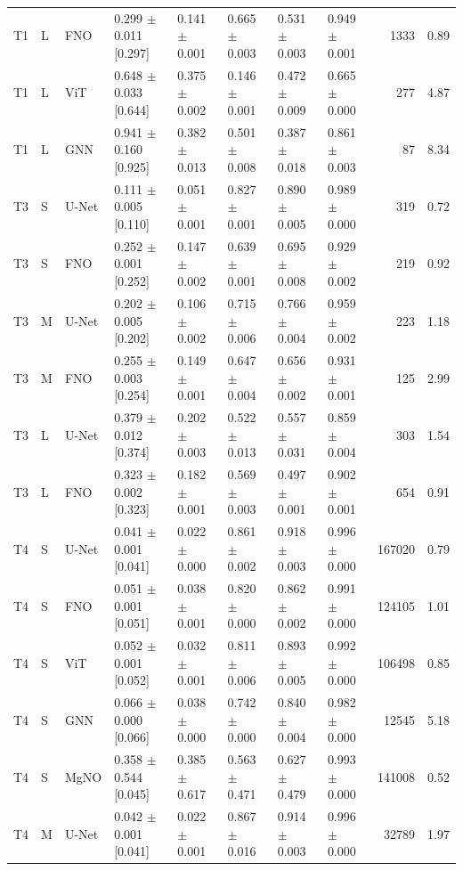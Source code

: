 \begin{table}[tb]
\begin{tabular}{llllllllrr}
T1 & L & FNO & 0.299 $\pm$ 0.011 [0.297] & 0.141 $\pm$ 0.001 & 0.665 $\pm$ 0.003 & 0.531 $\pm$ 0.003 & 0.949 $\pm$ 0.001 & 1333 & 0.89 \\
T1 & L & ViT & 0.648 $\pm$ 0.033 [0.644] & 0.375 $\pm$ 0.002 & 0.146 $\pm$ 0.001 & 0.472 $\pm$ 0.009 & 0.665 $\pm$ 0.000 & 277 & 4.87 \\
T1 & L & GNN & 0.941 $\pm$ 0.160 [0.925] & 0.382 $\pm$ 0.013 & 0.501 $\pm$ 0.008 & 0.387 $\pm$ 0.018 & 0.861 $\pm$ 0.003 & 87 & 8.34 \\
T3 & S & U-Net & 0.111 $\pm$ 0.005 [0.110] & 0.051 $\pm$ 0.001 & 0.827 $\pm$ 0.001 & 0.890 $\pm$ 0.005 & 0.989 $\pm$ 0.000 & 319 & 0.72 \\
T3 & S & FNO & 0.252 $\pm$ 0.001 [0.252] & 0.147 $\pm$ 0.002 & 0.639 $\pm$ 0.001 & 0.695 $\pm$ 0.008 & 0.929 $\pm$ 0.002 & 219 & 0.92 \\
T3 & M & U-Net & 0.202 $\pm$ 0.005 [0.202] & 0.106 $\pm$ 0.002 & 0.715 $\pm$ 0.006 & 0.766 $\pm$ 0.004 & 0.959 $\pm$ 0.002 & 223 & 1.18 \\
T3 & M & FNO & 0.255 $\pm$ 0.003 [0.254] & 0.149 $\pm$ 0.001 & 0.647 $\pm$ 0.004 & 0.656 $\pm$ 0.002 & 0.931 $\pm$ 0.001 & 125 & 2.99 \\
T3 & L & U-Net & 0.379 $\pm$ 0.012 [0.374] & 0.202 $\pm$ 0.003 & 0.522 $\pm$ 0.013 & 0.557 $\pm$ 0.031 & 0.859 $\pm$ 0.004 & 303 & 1.54 \\
T3 & L & FNO & 0.323 $\pm$ 0.002 [0.323] & 0.182 $\pm$ 0.001 & 0.569 $\pm$ 0.003 & 0.497 $\pm$ 0.001 & 0.902 $\pm$ 0.001 & 654 & 0.91 \\
T4 & S & U-Net & 0.041 $\pm$ 0.001 [0.041] & 0.022 $\pm$ 0.000 & 0.861 $\pm$ 0.002 & 0.918 $\pm$ 0.003 & 0.996 $\pm$ 0.000 & 167020 & 0.79 \\
T4 & S & FNO & 0.051 $\pm$ 0.001 [0.051] & 0.038 $\pm$ 0.001 & 0.820 $\pm$ 0.000 & 0.862 $\pm$ 0.002 & 0.991 $\pm$ 0.000 & 124105 & 1.01 \\
T4 & S & ViT & 0.052 $\pm$ 0.001 [0.052] & 0.032 $\pm$ 0.001 & 0.811 $\pm$ 0.006 & 0.893 $\pm$ 0.005 & 0.992 $\pm$ 0.000 & 106498 & 0.85 \\
T4 & S & GNN & 0.066 $\pm$ 0.000 [0.066] & 0.038 $\pm$ 0.000 & 0.742 $\pm$ 0.000 & 0.840 $\pm$ 0.004 & 0.982 $\pm$ 0.000 & 12545 & 5.18 \\
T4 & S & MgNO & 0.358 $\pm$ 0.544 [0.045] & 0.385 $\pm$ 0.617 & 0.563 $\pm$ 0.471 & 0.627 $\pm$ 0.479 & 0.993 $\pm$ 0.000 & 141008 & 0.52 \\
T4 & M & U-Net & 0.042 $\pm$ 0.001 [0.041] & 0.022 $\pm$ 0.001 & 0.867 $\pm$ 0.016 & 0.914 $\pm$ 0.003 & 0.996 $\pm$ 0.000 & 32789 & 1.97 \\

\end{tabular}
\end{table}
